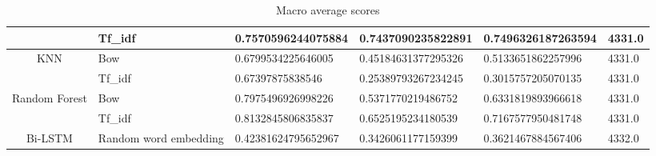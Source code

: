 \begin{table}[h!]
{\begin{tabular}{@{}clllll@{}}
\multicolumn{1}{|c|}{} &
  \multicolumn{1}{l|}{Tf\_idf} &
  \multicolumn{1}{l|}{0.7570596244075884} &
  \multicolumn{1}{l|}{\textbf{0.7437090235822891}} &
  \multicolumn{1}{l|}{\textbf{0.7496326187263594}} &
  \multicolumn{1}{l|}{4331.0} \\ \midrule
\multicolumn{1}{|c|}{\multirow{2}{*}{KNN}} &
  \multicolumn{1}{l|}{Bow} &
  \multicolumn{1}{l|}{0.6799534225646005} &
  \multicolumn{1}{l|}{0.45184631377295326} &
  \multicolumn{1}{l|}{0.5133651862257996} &
  \multicolumn{1}{l|}{4331.0} \\ \cmidrule(l){2-6} 
\multicolumn{1}{|c|}{} &
  \multicolumn{1}{l|}{Tf\_idf} &
  \multicolumn{1}{l|}{0.67397875838546} &
  \multicolumn{1}{l|}{0.25389793267234245} &
  \multicolumn{1}{l|}{0.3015757205070135} &
  \multicolumn{1}{l|}{4331.0} \\ \midrule
\multicolumn{1}{|l|}{\multirow{2}{*}{Random Forest}} &
  \multicolumn{1}{l|}{Bow} &
  \multicolumn{1}{l|}{0.7975496926998226} &
  \multicolumn{1}{l|}{0.5371770219486752} &
  \multicolumn{1}{l|}{0.6331819893966618} &
  \multicolumn{1}{l|}{4331.0} \\ \cmidrule(l){2-6} 
\multicolumn{1}{|l|}{} &
  \multicolumn{1}{l|}{Tf\_idf} &
  \multicolumn{1}{l|}{0.8132845806835837} &
  \multicolumn{1}{l|}{0.6525195234180539} &
  \multicolumn{1}{l|}{0.7167577950481748} &
  \multicolumn{1}{l|}{4331.0} \\ \midrule
\multicolumn{1}{|c|}{Bi-LSTM} &
  \multicolumn{1}{l|}{Random word embedding} &
  \multicolumn{1}{l|}{0.42381624795652967} &
  \multicolumn{1}{l|}{0.3426061177159399} &
  \multicolumn{1}{l|}{0.3621467884567406} &
  \multicolumn{1}{l|}{4332.0} \\ \bottomrule
\end{tabular}%
}
\caption{Macro average scores}
\end{table}

